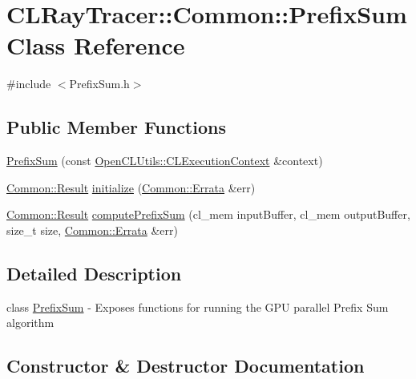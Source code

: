 \hypertarget{class_c_l_ray_tracer_1_1_common_1_1_prefix_sum}{}\section{C\+L\+Ray\+Tracer\+:\+:Common\+:\+:Prefix\+Sum Class Reference}
\label{class_c_l_ray_tracer_1_1_common_1_1_prefix_sum}


{\ttfamily \#include $<$Prefix\+Sum.\+h$>$}

\subsection*{Public Member Functions}
\begin{DoxyCompactItemize}
\item 
\hyperlink{class_c_l_ray_tracer_1_1_common_1_1_prefix_sum_a141860443551d0dc02946f863faaf604}{Prefix\+Sum} (const \hyperlink{class_c_l_ray_tracer_1_1_open_c_l_utils_1_1_c_l_execution_context}{Open\+C\+L\+Utils\+::\+C\+L\+Execution\+Context} \&context)
\item 
\hyperlink{_errata_8h_a389396702f1aff6e71eb21328b0775c1}{Common\+::\+Result} \hyperlink{class_c_l_ray_tracer_1_1_common_1_1_prefix_sum_a783f06c122a3081f4c955526c3524b67}{initialize} (\hyperlink{class_c_l_ray_tracer_1_1_common_1_1_errata}{Common\+::\+Errata} \&err)
\item 
\hyperlink{_errata_8h_a389396702f1aff6e71eb21328b0775c1}{Common\+::\+Result} \hyperlink{class_c_l_ray_tracer_1_1_common_1_1_prefix_sum_aed77ff0d3567b7672fd449e6326f9c77}{compute\+Prefix\+Sum} (cl\+\_\+mem input\+Buffer, cl\+\_\+mem output\+Buffer, size\+\_\+t size, \hyperlink{class_c_l_ray_tracer_1_1_common_1_1_errata}{Common\+::\+Errata} \&err)
\end{DoxyCompactItemize}


\subsection{Detailed Description}
class \hyperlink{class_c_l_ray_tracer_1_1_common_1_1_prefix_sum}{Prefix\+Sum} -\/ Exposes functions for running the G\+PU parallel Prefix Sum algorithm 

\subsection{Constructor \& Destructor Documentation}
